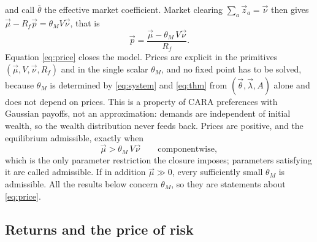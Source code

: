 \documentclass[12pt]{article}
\theoremstyle{definition}
\theoremstyle{remark}
\newcommand{\bth}{\bar\theta}
\begin{document}
%
and call $\bth$ the effective market coefficient. Market clearing
$\sum_a\vec z_a=\vec\nu$ then gives $\vec\mu-R_f\vec p=\theta_MV\vec\nu$, that
is
%
\begin{equation}
\vec p=\frac{\vec\mu-\theta_M\,V\vec\nu}{R_f} .
\label{eq:price}
\end{equation}
%
Equation \eqref{eq:price} closes the model. Prices are explicit in the
primitives $(\vec\mu,V,\vec\nu,R_f)$ and in the single scalar $\theta_M$, and no
fixed point has to be solved, because $\theta_M$ is determined by
\eqref{eq:system} and \eqref{eq:thm} from $(\vec\theta,\vec\lambda,A)$ alone and
does not depend on prices. This is a property of CARA preferences with Gaussian
payoffs, not an approximation: demands are independent of initial wealth, so
the wealth distribution never feeds back. Prices are positive, and the
equilibrium admissible, exactly when
%
\begin{equation}
\vec\mu>\theta_M\,V\vec\nu
\qquad\text{componentwise},
\label{eq:positive}
\end{equation}
%
which is the only parameter restriction the closure imposes; parameters
satisfying it are called admissible. If in addition $\vec\mu\gg0$, every
sufficiently small $\theta_M$ is admissible. All the results below concern $\theta_M$, so
they are statements about \eqref{eq:price}.

\subsection{Returns and the price of risk}
\label{sec:returns}
\end{document}
